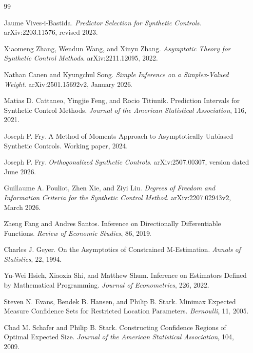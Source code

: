\documentclass{article}
\begin{document}
\begin{thebibliography}{99}

   Jaume Vives-i-Bastida. \emph{Predictor Selection for Synthetic Controls}. arXiv:2203.11576, revised 2023.

   Xiaomeng Zhang, Wendun Wang, and Xinyu Zhang. \emph{Asymptotic Theory for Synthetic Control Methods}. arXiv:2211.12095, 2022.

   Nathan Canen and Kyungchul Song. \emph{Simple Inference on a Simplex-Valued Weight}. arXiv:2501.15692v2, January 2026.

   Matias D. Cattaneo, Yingjie Feng, and Rocio Titiunik. Prediction Intervals for Synthetic Control Methods. \emph{Journal of the American Statistical Association}, 116, 2021.

   Joseph P. Fry. A Method of Moments Approach to Asymptotically Unbiased Synthetic Controls. Working paper, 2024.

   Joseph P. Fry. \emph{Orthogonalized Synthetic Controls}. arXiv:2507.00307, version dated June 2026.

   Guillaume A. Pouliot, Zhen Xie, and Ziyi Liu. \emph{Degrees of Freedom and Information Criteria for the Synthetic Control Method}. arXiv:2207.02943v2, March 2026.

   Zheng Fang and Andres Santos. Inference on Directionally Differentiable Functions. \emph{Review of Economic Studies}, 86, 2019.

   Charles J. Geyer. On the Asymptotics of Constrained M-Estimation. \emph{Annals of Statistics}, 22, 1994.

   Yu-Wei Hsieh, Xiaoxia Shi, and Matthew Shum. Inference on Estimators Defined by Mathematical Programming. \emph{Journal of Econometrics}, 226, 2022.

   Steven N. Evans, Bendek B. Hansen, and Philip B. Stark. Minimax Expected Measure Confidence Sets for Restricted Location Parameters. \emph{Bernoulli}, 11, 2005.

   Chad M. Schafer and Philip B. Stark. Constructing Confidence Regions of Optimal Expected Size. \emph{Journal of the American Statistical Association}, 104, 2009.


\end{thebibliography}
\end{document}
